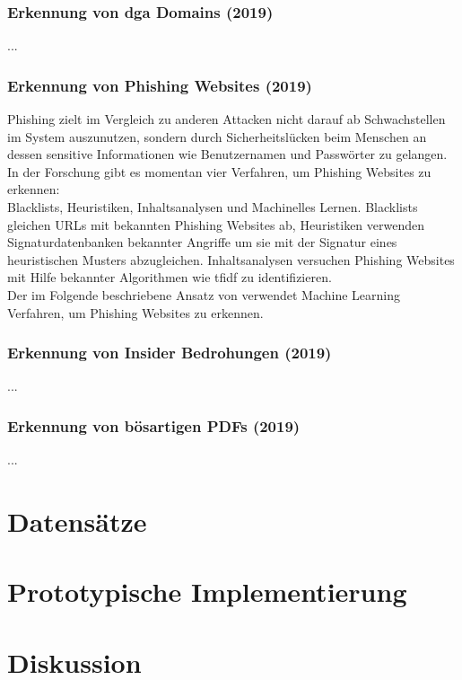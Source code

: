 \documentclass[
    12pt, %
    DIV10,
    ngerman, %
    a4paper, %
    oneside, %
    titlepage, %
    parskip=half, %
    headings=normal, %
    listof=totoc, %
    bibliography=totoc, %
    index=totoc, %
    captions=tableheading, %
    final %
]{scrreprt}
\begin{document}
\subsection{Erkennung von \ac{dga} Domains (2019)}
\textcite{Li2019}...
%
\subsection{Erkennung von Phishing Websites (2019)}
Phishing zielt im Vergleich zu anderen Attacken nicht darauf ab Schwachstellen im System auszunutzen, sondern durch Sicherheitslücken beim Menschen an dessen sensitive Informationen wie Benutzernamen und Passwörter zu gelangen.
In der Forschung gibt es momentan vier Verfahren, um Phishing Websites zu erkennen:\\
Blacklists, Heuristiken, Inhaltsanalysen und Machinelles Lernen. Blacklists gleichen URLs mit bekannten Phishing Websites ab, Heuristiken verwenden Signaturdatenbanken bekannter Angriffe um sie mit der Signatur eines heuristischen Musters abzugleichen. Inhaltsanalysen versuchen Phishing Websites mit Hilfe bekannter Algorithmen wie \ac{tfidf} zu identifizieren. \\
Der im Folgende beschriebene Ansatz von \textcite{Alswailem2019} verwendet Machine Learning Verfahren, um Phishing Websites zu erkennen.
%
\subsection{Erkennung von Insider Bedrohungen (2019)}
\textcite{Le2019}...
%
\subsection{Erkennung von bösartigen PDFs (2019)}
\textcite{Jeong2019}...
%
\chapter{Datensätze}
\chapter{Prototypische Implementierung}
\chapter{Diskussion}
\end{document}
